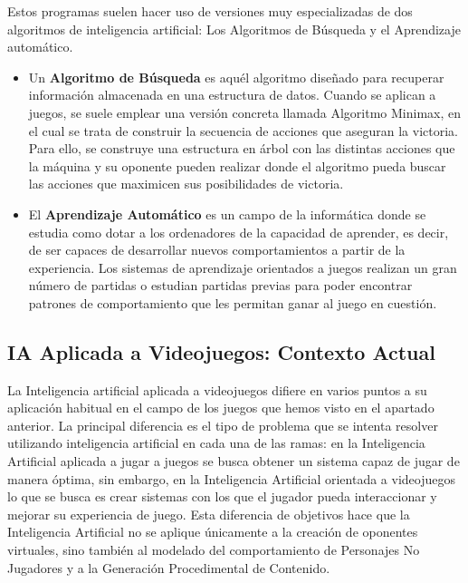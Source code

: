 Estos programas suelen hacer uso de versiones muy especializadas de dos algoritmos de inteligencia artificial: Los Algoritmos de Búsqueda y el Aprendizaje automático.
\begin{itemize}
\item Un \textbf{Algoritmo de Búsqueda} es aquél algoritmo diseñado para recuperar información almacenada en una estructura de datos. Cuando se aplican a juegos, se suele emplear una versión concreta llamada Algoritmo Minimax, en el cual se trata de construir la secuencia de acciones que aseguran la victoria. Para ello, se construye una estructura en árbol con las distintas acciones que la máquina y su oponente pueden realizar donde el algoritmo pueda buscar las acciones que maximicen sus posibilidades de victoria. 
\item El \textbf{Aprendizaje Automático} es un campo de la informática donde se estudia como dotar a los ordenadores de la capacidad de aprender, es decir, de ser capaces de desarrollar nuevos comportamientos a partir de la experiencia. Los sistemas de aprendizaje orientados a juegos realizan un gran número de partidas o estudian partidas previas para poder encontrar patrones de comportamiento que les permitan ganar al juego en cuestión.
\end{itemize}

\subsection{IA Aplicada a Videojuegos: Contexto Actual}
La Inteligencia artificial aplicada a videojuegos difiere en varios puntos a su aplicación habitual en el campo de los juegos que hemos visto en el apartado anterior. La principal diferencia es el tipo de problema que se intenta resolver utilizando inteligencia artificial en cada una de las ramas: en la Inteligencia Artificial aplicada a jugar a juegos se busca obtener un sistema capaz de jugar de manera óptima, sin embargo, en la Inteligencia Artificial orientada a videojuegos lo que se busca es crear sistemas con los que el jugador pueda interaccionar y mejorar su experiencia de juego. Esta diferencia de objetivos hace que la Inteligencia Artificial no se aplique únicamente a la creación de oponentes virtuales, sino también al modelado del comportamiento de Personajes No Jugadores y a la Generación Procedimental de Contenido\cite{ai_and_games}.

